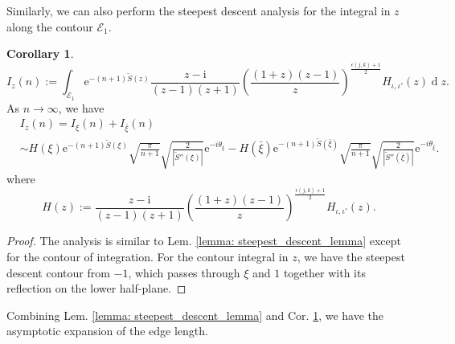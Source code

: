 \documentclass[12pt]{amsart}
\newcommand{\io}{{\iota}}
\newcommand{\tS}{{\widetilde S}}
\numberwithin{equation}{section}
\theoremstyle{definition}
\newtheorem{cor}[thm]{Corollary}
\begin{document}
Similarly, we can also perform the steepest descent analysis for the integral in $z$ along the contour $\mathcal E_1$. 

\begin{cor}
    \label{cor: steepest descent in z}
    $$I_z(n):=\int_{\mathcal{E}_1} \mathrm{e}^{-(n+1)\tS(z)}\frac{z-\mathrm i}{(z-1)(z+1)}\left(\frac{(1+z)(z-1)}{z}\right)^{\frac{\epsilon(j,k)+1}{2}}H_{\io,\io'}(z)  \operatorname{d}z.$$
    As $n \to \infty$, we have 
    \begin{equation}
    \begin{aligned}
        &I_z(n)=I_\xi(n)+I_{\bar \xi}(n) \\
        &\sim H(\xi)\mathrm e^{-(n+1) \tS(\xi)}\sqrt{\frac{\pi}{n+1}}\sqrt{\frac{2}{|\tS''(\xi)|}}\mathrm e^{-i\theta_\xi}-H(\bar \xi)\mathrm e^{-(n+1) \tS(\bar \xi)}\sqrt{\frac{\pi}{n+1}}\sqrt{\frac{2}{|\tS''(\bar \xi)|}}\mathrm e^{-i\theta_{\bar \xi}}.
    \end{aligned}
    \end{equation}
where 
\[
H(z):= \frac{z-\mathrm i}{(z-1)(z+1)}\left(\frac{(1+z)(z-1)}{z}\right)^{\frac{\epsilon(j,k)+1}{2}}H_{\io,\io'}(z).
\]
\end{cor}
\begin{proof}
    The analysis is similar to Lem. \ref{lemma: steepest_descent_lemma} except for the contour of integration. For the contour integral in $z$, we have the steepest descent contour from $-1$, which passes through $\xi$ and $1$ together with its reflection on the lower half-plane. 
\end{proof}
 
Combining Lem. \ref{lemma: steepest_descent_lemma} and Cor. \ref{cor: steepest descent in z}, we have the asymptotic expansion of the edge length. 
\end{document}
